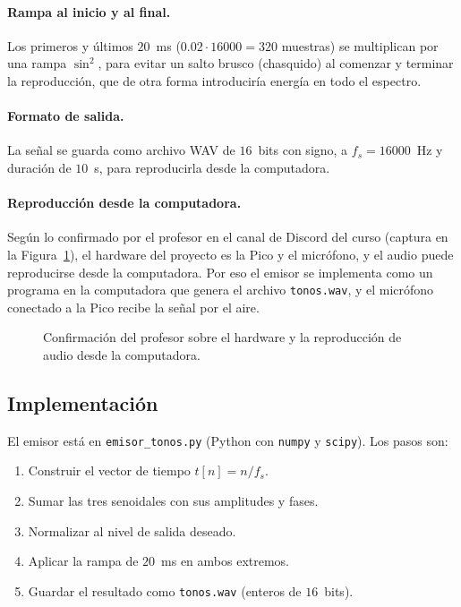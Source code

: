 \documentclass[11pt,a4paper]{article}
\begin{document}
\paragraph{Rampa al inicio y al final.}
Los primeros y últimos $20$~ms ($0.02\cdot 16000 = 320$ muestras) se
multiplican por una rampa $\sin^2$, para evitar un salto brusco
(chasquido) al comenzar y terminar la reproducción, que de otra forma
introduciría energía en todo el espectro.

\paragraph{Formato de salida.}
La señal se guarda como archivo WAV de $16$~bits con signo, a
$f_s = 16000$~Hz y duración de $10$~s, para reproducirla desde la
computadora.

\paragraph{Reproducción desde la computadora.}
Según lo confirmado por el profesor en el canal de Discord del curso
(captura en la Figura~\ref{fig:discord}), el hardware del proyecto es la
Pico y el micrófono, y el audio puede reproducirse desde la computadora.
Por eso el emisor se implementa como un programa en la computadora que
genera el archivo \texttt{tonos.wav}, y el micrófono conectado a la Pico
recibe la señal por el aire.

\begin{figure}[h]
  \centering
  \caption{Confirmación del profesor sobre el hardware y la reproducción de audio desde la computadora.}
  \label{fig:discord}
\end{figure}

\subsection{Implementación}
El emisor está en \texttt{emisor\_tonos.py} (Python con \texttt{numpy} y
\texttt{scipy}). Los pasos son:
\begin{enumerate}
  \item Construir el vector de tiempo $t[n] = n/f_s$.
  \item Sumar las tres senoidales con sus amplitudes y fases.
  \item Normalizar al nivel de salida deseado.
  \item Aplicar la rampa de $20$~ms en ambos extremos.
  \item Guardar el resultado como \texttt{tonos.wav} (enteros de $16$~bits).
\end{enumerate}
\end{document}
